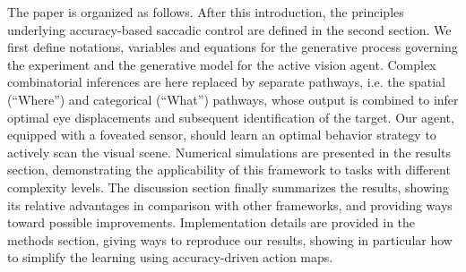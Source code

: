 The paper is organized as follows. After this introduction, the principles underlying accuracy-based saccadic control are defined in the second section. We first define notations, variables and equations for the generative process governing the experiment and the generative model for the active vision agent. Complex combinatorial inferences are here replaced by separate pathways, i.e. the spatial (``Where'') and categorical (``What'') pathways, whose output is combined to infer optimal eye displacements and subsequent identification of the target. Our agent, equipped with a foveated sensor, should learn an optimal behavior strategy to actively scan the visual scene. Numerical simulations are presented in the results section, demonstrating the applicability of this framework to tasks with different complexity levels. The discussion section finally summarizes the results, showing its relative advantages in comparison with other frameworks, and providing ways toward possible improvements. Implementation details are provided in the methods section, giving ways to reproduce our results, showing in particular how to simplify the learning using accuracy-driven action maps.
